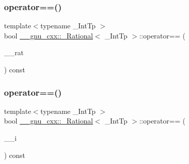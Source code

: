 \subsubsection{\texorpdfstring{operator==()}{operator==()}\hspace{0.1cm}{\footnotesize\ttfamily [1/2]}}
{\footnotesize\ttfamily template$<$typename \+\_\+\+Int\+Tp $>$ \\
bool \hyperlink{class____gnu__cxx_1_1__Rational}{\+\_\+\+\_\+gnu\+\_\+cxx\+::\+\_\+\+Rational}$<$ \+\_\+\+Int\+Tp $>$\+::operator== (\begin{DoxyParamCaption}\item[{const \hyperlink{class____gnu__cxx_1_1__Rational}{\+\_\+\+Rational}$<$ \+\_\+\+Int\+Tp $>$ \&}]{\+\_\+\+\_\+rat }\end{DoxyParamCaption}) const\hspace{0.3cm}{\ttfamily [inline]}}

\mbox{\label{class____gnu__cxx_1_1__Rational_aad08ed01c44597de5ac944b4d11f1d44}} 
\subsubsection{\texorpdfstring{operator==()}{operator==()}\hspace{0.1cm}{\footnotesize\ttfamily [2/2]}}
{\footnotesize\ttfamily template$<$typename \+\_\+\+Int\+Tp $>$ \\
bool \hyperlink{class____gnu__cxx_1_1__Rational}{\+\_\+\+\_\+gnu\+\_\+cxx\+::\+\_\+\+Rational}$<$ \+\_\+\+Int\+Tp $>$\+::operator== (\begin{DoxyParamCaption}\item[{\hyperlink{class____gnu__cxx_1_1__Rational_a7987be70fc59d0d980621fd65828b74a}{value\+\_\+type}}]{\+\_\+\+\_\+i }\end{DoxyParamCaption}) const\hspace{0.3cm}{\ttfamily [inline]}}

\mbox{\label{class____gnu__cxx_1_1__Rational_ae2a1d9fc6a2368b1f89e8d55424738f6}} 
